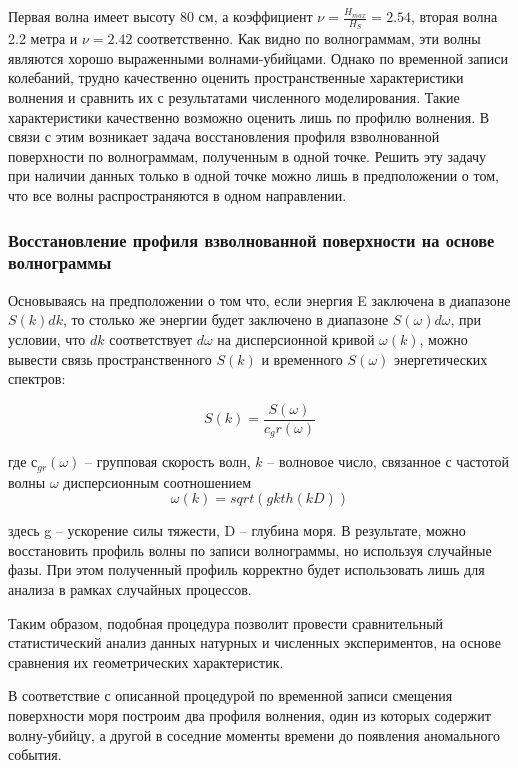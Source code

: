 Первая волна имеет высоту 80 см, а коэффициент $\nu=\frac{H_{max}}{H_S}=2.54$, вторая волна 2.2 метра и $\nu=2.42$ соответственно. Как видно по  волнограммам, эти волны  являются хорошо выраженными волнами-убийцами.  Однако по временной записи колебаний, трудно качественно оценить пространственные характеристики волнения и сравнить их с результатами численного моделирования. Такие характеристики качественно возможно оценить лишь по профилю волнения. В связи с этим  возникает задача восстановления профиля взволнованной поверхности по волнограммам, полученным в одной точке. Решить эту задачу при наличии данных только в одной точке можно лишь в предположении о том, что все волны распространяются в одном направлении.

\textcolor[rgb]{1.00,0.00,0.00}{\subsubsection{Восстановление профиля взволнованной поверхности на основе волнограммы}
}

Основываясь на предположении о том что, если энергия E заключена в диапазоне $S(k)dk$, то столько же энергии будет заключено в диапазоне $S(\omega)d\omega$,
при условии, что $dk$ соответствует $d\omega$ на дисперсионной кривой $\omega(k)$, можно вывести связь пространственного $S(k)$ и временного $S(\omega)$ энергетических спектров:

\begin{equation}\label{eq:relSpectrs}
S(k)=\frac{S(\omega)}{c_gr(\omega)}
\end{equation}

где $с_{gr}(\omega)$ – групповая скорость волн, $k$ – волновое число, связанное с частотой волны $\omega$ дисперсионным соотношением
\begin{equation}\label{eq:dispRelation}
  \omega(k)=sqrt(gkth(kD))
\end{equation}


здесь g – ускорение силы тяжести, D – глубина моря.  В результате, можно восстановить профиль волны по записи волнограммы, но используя случайные фазы. При этом полученный профиль корректно будет использовать лишь для анализа в рамках случайных процессов.

Таким образом, подобная процедура позволит провести сравнительный статистический анализ данных натурных и численных экспериментов, на основе сравнения их геометрических характеристик.

В соответствие с описанной процедурой по временной записи смещения поверхности  моря построим два профиля волнения, один из которых содержит волну-убийцу, а другой в соседние моменты времени до появления аномального события.

